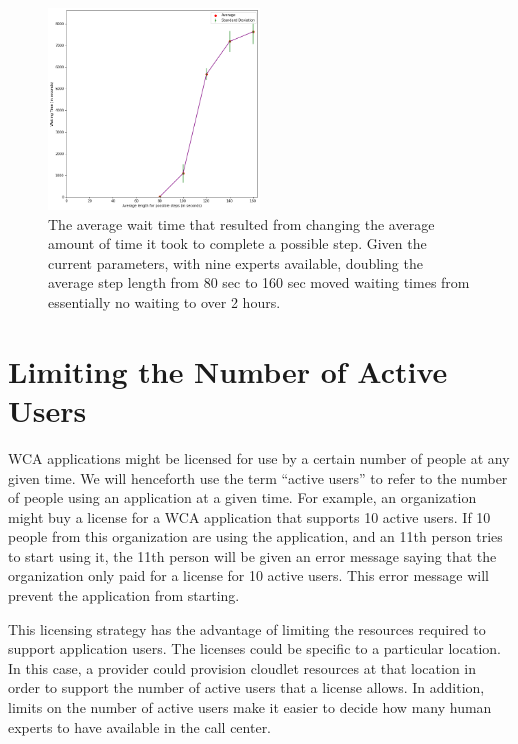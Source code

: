 \begin{figure}[h]
  \includegraphics[width=0.5\textwidth]{figures/montecarlo/vary_step_length.png}
  \caption{
    The average wait time that resulted from changing the average amount of time
    it took to complete a possible step.
    Given the current parameters, with nine experts available, doubling the
    average
    step length from 80 sec to 160 sec moved waiting times from essentially no
    waiting to over 2 hours.
  }\label{fig:vary_step_length}
\end{figure}

\section{Limiting the Number of Active Users}

WCA applications might be licensed for use by a certain number of people at
any given time.
We will henceforth use the term ``active users'' to refer to the number of
people using an application at a given time.
For example, an organization might buy a license for a WCA application that
supports 10 active users.
If 10 people from this organization are using the application, and an 11th
person tries to start using it, the 11th person will be given an error message
saying that the organization only paid for a license for 10 active users.
This error message will prevent the application from starting.

This licensing strategy has the advantage of limiting the resources required to
support application users.
The licenses could be specific to a particular location.
In this case, a provider could provision cloudlet resources at that location in
order to support the number of active users that a license allows.
In addition, limits on the number of active users make it easier to decide how
many human experts to have available in the call center.

